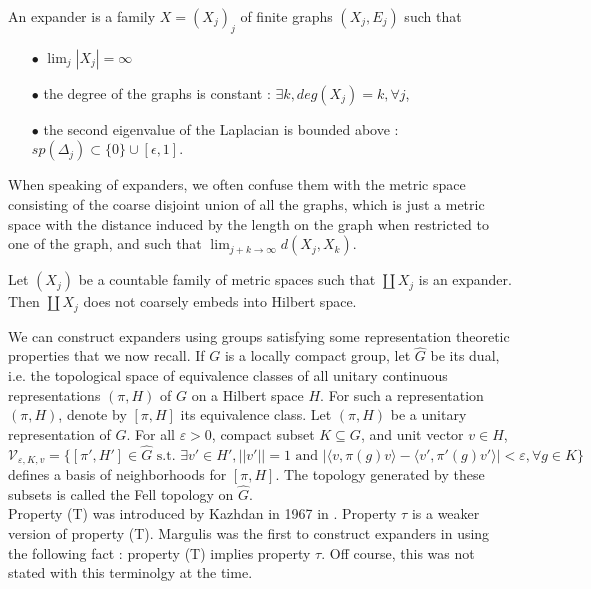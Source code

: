 \begin{definition}
An expander is a family $X=(X_j)_j$ of finite graphs $(X_j,E_j)$ such that 
\begin{itemize}
\item[$\bullet$] $\lim_{j}|X_j|=\infty$
\item[$\bullet$] the degree of the graphs is constant : $\exists k, deg(X_j)=k,\forall j$,
\item[$\bullet$] the second eigenvalue of the Laplacian is bounded above : $sp(\Delta_j)\subset \{0\}\cup [\epsilon,1]$.
\end{itemize}
\end{definition}
When speaking of expanders, we often confuse them with the metric space consisting of the coarse disjoint union of all the graphs, which is just a metric space with the distance induced by the length on the graph when restricted to one of the graph, and such that $\lim_{j+k\rightarrow \infty}d(X_j,X_k)$.

\begin{prop}\cite{NowakYu}
Let $(X_j)$ be a countable family of metric spaces such that $\coprod X_j$ is an expander. Then $\coprod X_j$ does not coarsely embeds into Hilbert space.
\end{prop}

We can construct expanders using groups satisfying some representation theoretic properties that we now recall. If $G$ is a locally compact group, let $\hat G $ be its dual, i.e. the topological space of equivalence classes of all unitary continuous representations $(\pi,H)$ of $G$ on a Hilbert space $H$. For such a representation $(\pi,H)$, denote by $[\pi,H]$ its equivalence class. Let $(\pi,H)$ be a unitary representation of $G$. For all $\varepsilon>0$, compact subset $K\subseteq G$, and unit vector $v\in H$,
\[\mathcal V_{\varepsilon,K,v} = 
		\{ [\pi',H'] \in \hat G\text{ s.t. } \exists v'\in H', ||v'||=1 \text{ and }
		| \langle v,\pi(g)v\rangle - \langle v',\pi'(g)v' \rangle |<\varepsilon , \forall g\in K\}\]
defines a basis of neighborhoods for $[\pi,H]$. The topology generated by these subsets is called the Fell topology on $\hat G$.\\

Property (T) was introduced by Kazhdan in 1967 in \cite{kazhdan}. Property $\tau$ is a weaker version of property (T). Margulis was the first to construct expanders in \cite{MargulisExplicit} using the following fact : property (T) implies property $\tau$. Off course, this was not stated with this terminolgy at the time.

